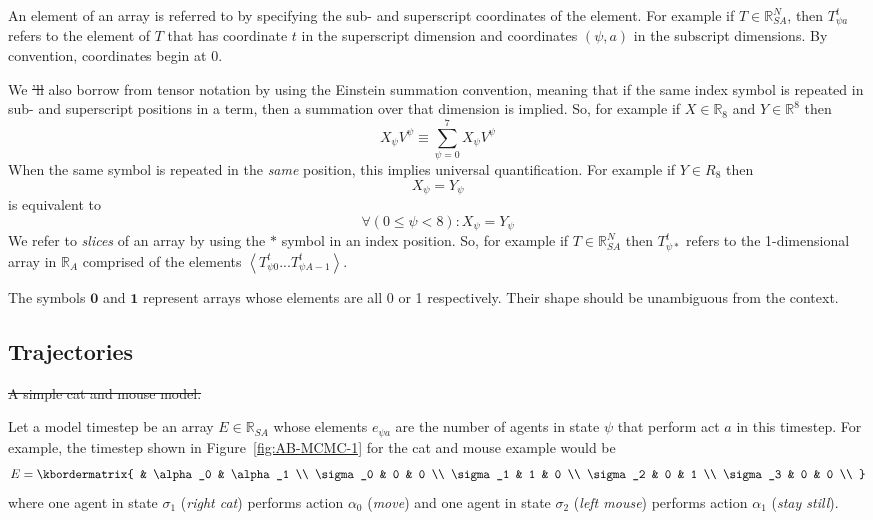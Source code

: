 \documentclass{article}
\providecommand{\DIFaddtex}[1]{{\protect\color{blue}\uwave{#1}}} %
\providecommand{\DIFdeltex}[1]{{\protect\color{red}\sout{#1}}}                      %
\providecommand{\DIFaddbegin}{} %
\providecommand{\DIFaddend}{} %
\providecommand{\DIFdelbegin}{} %
\providecommand{\DIFdelend}{} %
\providecommand{\DIFdelFL}[1]{\DIFdel{#1}} %
\providecommand{\DIFadd}[1]{\texorpdfstring{\DIFaddtex{#1}}{#1}} %
\providecommand{\DIFdel}[1]{\texorpdfstring{\DIFdeltex{#1}}{}} %
\newcommand{\DIFscaledelfig}{0.5}
\newlength{\DIFdelgraphicswidth} %
\newlength{\DIFdelgraphicsheight} %
\newcommand{\DIFaddincludegraphics}[2][]{{\color{blue}\fbox{\DIFOincludegraphics[#1]{#2}}}} %
\newcommand{\DIFdelincludegraphics}[2][]{%
\sbox{\DIFdelgraphicsbox}{\DIFOincludegraphics[#1]{#2}}%
\settoboxwidth{\DIFdelgraphicswidth}{\DIFdelgraphicsbox} %
\settoboxtotalheight{\DIFdelgraphicsheight}{\DIFdelgraphicsbox} %
\scalebox{\DIFscaledelfig}{%
\parbox[b]{\DIFdelgraphicswidth}{\usebox{\DIFdelgraphicsbox}\\[-\baselineskip] \rule{\DIFdelgraphicswidth}{0em}}\llap{\resizebox{\DIFdelgraphicswidth}{\DIFdelgraphicsheight}{%
\setlength{\unitlength}{\DIFdelgraphicswidth}%
\begin{picture}(1,1)%
\thicklines\linethickness{2pt} %
{\color[rgb]{1,0,0}\put(0,0){\framebox(1,1){}}}%
{\color[rgb]{1,0,0}\put(0,0){\line( 1,1){1}}}%
{\color[rgb]{1,0,0}\put(0,1){\line(1,-1){1}}}%
\end{picture}%
}\hspace*{3pt}}} %
} %
\DeclareRobustCommand{\DIFaddbegin}{\DIFOaddbegin \let\includegraphics\DIFaddincludegraphics} %
\DeclareRobustCommand{\DIFaddend}{\DIFOaddend \let\includegraphics\DIFOincludegraphics} %
\DeclareRobustCommand{\DIFdelbegin}{\DIFOdelbegin \let\includegraphics\DIFdelincludegraphics} %
\DeclareRobustCommand{\DIFdelend}{\DIFOaddend \let\includegraphics\DIFOincludegraphics} %
\begin{document}
An element of an array is referred to by specifying the sub- and superscript coordinates of the element. For example if $T \in \mathbb{R}^N_{SA}$, then $T^t_{\psi a}$ refers to the element of $T$ that has coordinate $t$ in the superscript dimension and coordinates $(\psi,a)$ in the subscript dimensions. By convention, coordinates begin at 0.

We \DIFdelbegin \DIFdel{'ll }\DIFdelend \DIFaddbegin \DIFadd{will }\DIFaddend also borrow from tensor notation by using the Einstein summation convention, meaning that if the same index symbol is repeated in sub- and superscript positions in a term, then a summation over that dimension is implied. So, for example if $X \in \mathbb{R}_8$ and $Y \in \mathbb{R}^8$ then
\[
X_\psi V^\psi \equiv \sum_{\psi=0}^7 X_\psi  V^\psi
\]
When the same symbol is repeated in the \textit{same} position, this implies universal quantification. For example if $Y\in R_8$ then
\[
X_\psi = Y_\psi 
\]
is equivalent to
\[
\forall (0 \le \psi < 8) : X_\psi = Y_\psi 
\]
We refer to \textit{slices} of an array by using the $*$ symbol in an index position. So, for example if $T \in \mathbb{R}^N_{SA}$ then $T^t_{\psi *}$ refers to the 1-dimensional array in $\mathbb{R}_A$ comprised of the elements $\left<T^t_{\psi 0}...T^t_{\psi A-1}\right>$.

The symbols $\mathbf{0}$ and $\mathbf{1}$ represent arrays whose elements are all 0 or 1 respectively. Their shape should be unambiguous from the context.

\subsection{Trajectories \DIFaddbegin \DIFadd{and Constraints}\DIFaddend }

\DIFdelbegin %
{%
\DIFdelFL{A simple cat and mouse model.}%
}

\DIFdelend Let a model timestep be an array $E \in \mathbb{R}_{SA}$ whose elements $e_{\psi a}$ are the number of agents in state $\psi$ that perform act $a$ in this timestep. For example, the timestep shown in Figure~\ref{fig:AB-MCMC-1} for the cat and mouse example would be
\[
E = \kbordermatrix{
	& \alpha_0 & \alpha_1 \\
	\sigma_0 & 0 & 0 \\
	\sigma_1 & 1 & 0 \\
	\sigma_2 & 0  & 1 \\
	\sigma_3 & 0 & 0 \\
}
\]
where one agent in state $\sigma_1$ (\textit{right cat}) performs action $\alpha_0$ (\textit{move}) and one agent in state $\sigma_2$ (\textit{left mouse}) performs action $\alpha_1$ (\textit{stay still}).
\end{document}
